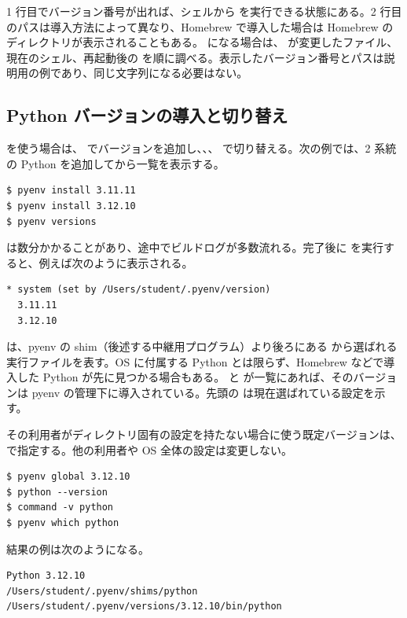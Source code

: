 1 行目でバージョン番号が出れば、シェルから  を実行できる状態にある。2 行目のパスは導入方法によって異なり、Homebrew で導入した場合は Homebrew の  ディレクトリが表示されることもある。 になる場合は、 が変更したファイル、現在のシェル、再起動後の  を順に調べる。表示したバージョン番号とパスは説明用の例であり、同じ文字列になる必要はない。

\subsection{Python バージョンの導入と切り替え}

 を使う場合は、 でバージョンを追加し、、、 で切り替える。次の例では、2 系統の Python を追加してから一覧を表示する。

\begin{lstlisting}[numbers=none, xleftmargin=2\zw]
$ pyenv install 3.11.11
$ pyenv install 3.12.10
$ pyenv versions
\end{lstlisting}

 は数分かかることがあり、途中でビルドログが多数流れる。完了後に  を実行すると、例えば次のように表示される。

\begin{lstlisting}[numbers=none, xleftmargin=2\zw]
* system (set by /Users/student/.pyenv/version)
  3.11.11
  3.12.10
\end{lstlisting}

 は、pyenv の shim（後述する中継用プログラム）より後ろにある  から選ばれる実行ファイルを表す。OS に付属する Python とは限らず、Homebrew などで導入した Python が先に見つかる場合もある。 と  が一覧にあれば、そのバージョンは pyenv の管理下に導入されている。先頭の \code{*} は現在選ばれている設定を示す。

その利用者がディレクトリ固有の設定を持たない場合に使う既定バージョンは、 で指定する。他の利用者や OS 全体の設定は変更しない。

\begin{lstlisting}[numbers=none, xleftmargin=2\zw]
$ pyenv global 3.12.10
$ python --version
$ command -v python
$ pyenv which python
\end{lstlisting}

結果の例は次のようになる。

\begin{lstlisting}[numbers=none, xleftmargin=2\zw]
Python 3.12.10
/Users/student/.pyenv/shims/python
/Users/student/.pyenv/versions/3.12.10/bin/python
\end{lstlisting}

